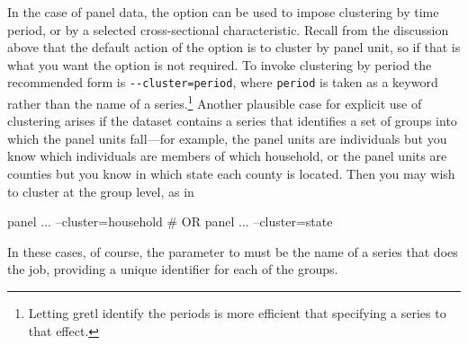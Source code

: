 In the case of panel data, the  option can be used to
impose clustering by time period, or by a selected cross-sectional
characteristic. Recall from the discussion above that the default
action of the  option is to cluster by panel unit, so
if that is what you want the  option is not required.
To invoke clustering by period the recommended form is
\verb|--cluster=period|, where \texttt{period} is taken as a keyword
rather than the name of a series.\footnote{Letting gretl identify the
  periods is more efficient that specifying a series to that effect.}
Another plausible case for explicit use of clustering arises if the
dataset contains a series that identifies a set of groups into which
the panel units fall---for example, the panel units are individuals
but you know which individuals are members of which household, or the
panel units are counties but you know in which state each county is
located. Then you may wish to cluster at the group level, as in
\begin{code}
panel ... --cluster=household
# OR
panel ... --cluster=state
\end{code}
In these cases, of course, the parameter to  must be
the name of a series that does the job, providing a unique identifier
for each of the groups.

